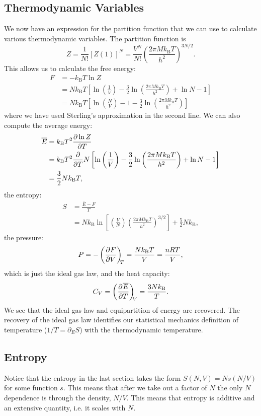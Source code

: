 \documentclass[a4paper]{article}
\newcommand{\boltzmann}{k_\mathrm{B}}
\newcommand{\mean}[1]{\overline{#1}}
\begin{document}
    \subsection{Thermodynamic Variables}
    We now have an expression for the partition function that we can use to calculate various thermodynamic variables.
    The partition function is
    \[Z = \frac{1}{N!}[Z(1)]^N = \frac{V^N}{N!}\left( \frac{2\pi M\boltzmann T}{h^2} \right)^{3N/2}.\]
    This allows us to calculate the free energy:
    \begin{align*}
        F &= -\boltzmann T\ln Z\\
        &= N\boltzmann T\left[ \ln\left( \frac{1}{V} \right) - \frac{3}{2} \ln\left( \frac{2\pi M\boltzmann T}{h^2} \right) + \ln N - 1\right]\\
        &= N\boltzmann T \left[ \ln\left( \frac{N}{V} \right) - 1 - \frac{3}{2}\ln\left( \frac{2\pi M\boltzmann T}{h^2} \right) \right]
    \end{align*}
    where we have used Sterling's approximation in the second line.
    We can also compute the average energy:
    \begin{align*}
        \mean{E} &= \boltzmann  T^2\pdv{\ln Z}{T}\\
        &= \boltzmann T^2\pdv{T} N \left[ \ln\left( \frac{1}{V} \right) - \frac{3}{2} \ln\left( \frac{2\pi M\boltzmann T}{h^2} \right) + \ln N - 1\right]\\
        &= \frac{3}{2}N\boltzmann T,
    \end{align*}
    the entropy:
    \begin{align*}
        S &= \frac{\mean{E} - F}{T}\\
        &= N\boltzmann \ln\left[\left( \frac{V}{N} \right)\left( \frac{2\pi M \boltzmann T}{h^2} \right)^{3/2} \right] + \frac{5}{2}N\boltzmann,
    \end{align*}
    the pressure:
    \[P = -\pdvconst{F}{V}{T} = \frac{N\boltzmann T}{V} = \frac{nRT}{V},\]
    which is just the ideal gas law, and the heat capacity:
    \[C_V = \pdvconst{\mean{E}}{T}{V} = \frac{3N\boltzmann }{T}.\]
    We see that the ideal gas law and equipartition of energy are recovered.
    The recovery of the ideal gas law identifies our statistical mechanics definition of temperature (\(1/T = \partial_E S\)) with the thermodynamic temperature.
    
    \subsection{Entropy}
    Notice that the entropy in the last section takes the form \(S(N, V) = Ns(N/V)\) for some function \(s\).
    This means that after we take out a factor of \(N\) the only \(N\) dependence is through the density, \(N/V\).
    This means that entropy is additive and an extensive quantity, i.e. it scales with \(N\).
    
\end{document}
